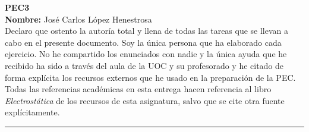 \documentclass[11pt, a4paper]{article}
\begin{document}
	\begin{center}
		\Large{ \textbf{PEC3} } \\
		\vspace{0.5cm}
		\normalsize{\textbf{Nombre:} José Carlos López Henestrosa} \\
		\vspace{0.5cm}
		\normalsize{Declaro que ostento la autoría total y llena de todas las tareas que se llevan a cabo en el presente documento. Soy la única persona que ha elaborado cada ejercicio. No he compartido los enunciados con nadie y la única ayuda que he recibido ha sido a través del aula de la UOC y su profesorado y he citado de forma explícita los recursos externos que he usado en la preparación de la PEC.} \\
		\vspace{0.5cm}
		\normalsize{Todas las referencias académicas en esta entrega hacen referencia al libro \textit{Electrostática} de los recursos de esta asignatura, salvo que se cite otra fuente explícitamente.}
	\end{center}

	\vspace{1cm}
	\hrule
	\vspace{1cm}
\end{document}
